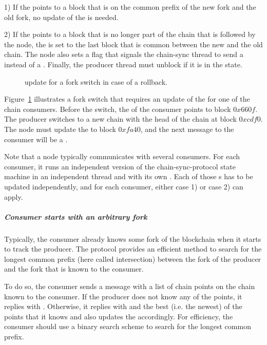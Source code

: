 1) If the \readpointer{} points to a block that is on the common prefix of the new
fork and the old fork, no update of the \readpointer{} is needed.

2) If the \readpointer{} points to a block that is no longer part of the chain that is followed by the node,
the \readpointer{} is set to the last block that is common between the new and the old chain.
The node also sets a flag that signals the chain-sync thread to send a \MsgRollBackward{} instead
of a \MsgRollForward.
Finally, the producer thread must unblock if it is in the \StMustReply{} state.

\begin{figure}[ht]
\begin{center}
\end{center}
\caption{\readpointer{} update for a fork switch in case of a rollback.}
\label{read-pointer-rollback}
\end{figure}

Figure~\ref{read-pointer-rollback} illustrates a fork switch that requires an update of the \readpointer{}
for one of the chain consumers.
Before the switch, the \readpointer{} of the consumer points to block $0x660f$.
The producer switches to a new chain with the head of the chain at block $0xcdf0$.
The node must update the \readpointer{} to block $0xfa40$, and the next message to the consumer
will be a \MsgRollBackward.

Note that a node typically communicates with several consumers. For each consumer, it runs an independent
version of the chain-sync-protocol state machine in an independent thread and with its own \readpointer{}.
Each of those \readpointer{}s has to be updated independently, and for each consumer,
either case 1) or case 2) can apply.

\subparagraph{Consumer starts with an arbitrary fork}
Typically, the consumer already knows some fork of the blockchain when it
starts to track the producer.
The protocol provides an efficient method to search for the longest common prefix (here called intersection)
between the fork of the producer and the fork that is known to the consumer.

To do so, the consumer sends a \MsgFindIntersect{} message with a list of chain
points on the chain known to the consumer.
If the producer does not know any of the points, it replies with \MsgIntersectNotFound.
Otherwise, it replies with \MsgIntersectFound{} and the best (i.e. the newest) of the points that it knows
and also updates the \readpointer{} accordingly.
For efficiency, the consumer should use a binary search scheme to search for the longest common
prefix.

